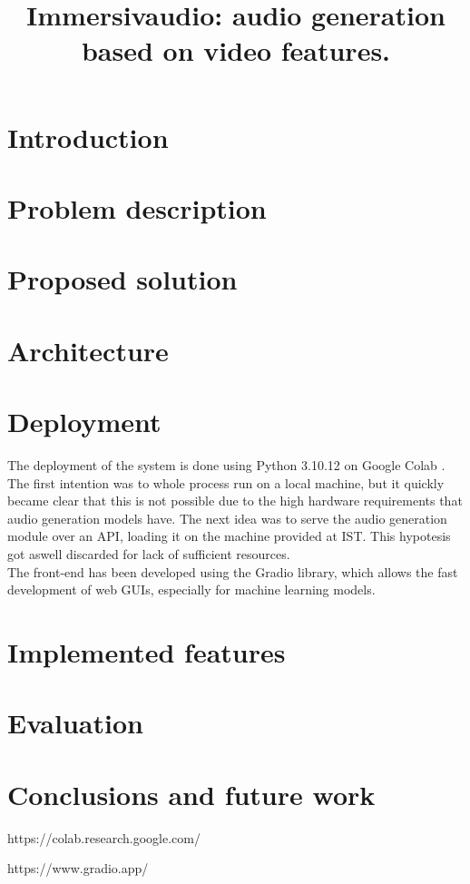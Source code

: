 \documentclass[conference]{IEEEtran}
\begin{document}
\title{Immersivaudio: audio generation based on video features.}

\author{
\and
{}
\and
{}
}

\maketitle

\section{Introduction}

\section{Problem description}

\section{Proposed solution}

\section{Architecture}

\section{Deployment}
The deployment of the system is done using Python 3.10.12 on Google Colab \cite{Colab}. The first intention was to whole process run on a local machine, but it quickly became clear that this is not possible due to the high hardware requirements that audio generation models have. The next idea was to serve the audio generation module over an API, loading it on the machine provided at IST. This hypotesis got aswell discarded for lack of sufficient resources.
\\The front-end has been developed using the Gradio \cite{Gradio} library, which allows the fast development of web GUIs, especially for machine learning models.

\section{Implemented features}

\section{Evaluation}

\section{Conclusions and future work}


\begin{thebibliography}{00}
    https://colab.research.google.com/

    https://www.gradio.app/

\end{thebibliography}
\end{document}
